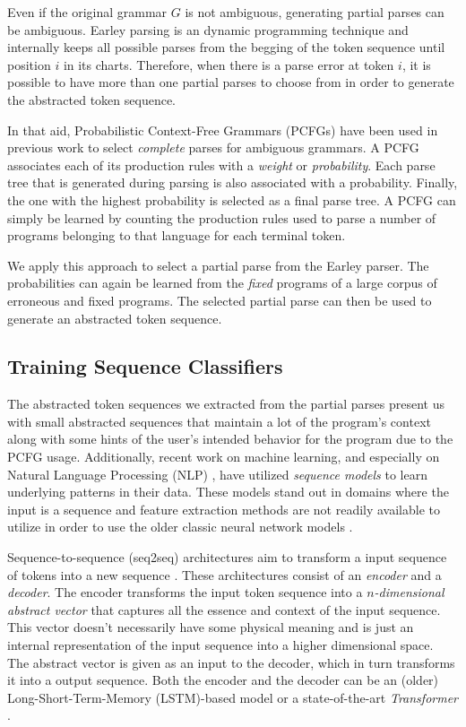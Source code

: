 

 Even if the original grammar $G$ is
not ambiguous, generating partial parses can be ambiguous. Earley parsing is an
dynamic programming technique and internally keeps all possible parses from the
begging of the token sequence until position $i$ in its charts. Therefore, when
there is a parse error at token $i$, it is possible to have more than one
partial parses to choose from in order to generate the abstracted token
sequence.

In that aid, Probabilistic Context-Free Grammars (PCFGs) have been used in
previous work \citep{?} to select \emph{complete} parses for ambiguous grammars.
A PCFG associates each of its production rules with a \emph{weight} or
\emph{probability}. Each parse tree that is generated during parsing is also
associated with a probability. Finally, the one with the highest probability is
selected as a final parse tree. A PCFG can simply be learned \citep{?} by
counting the production rules used to parse a number of programs belonging to
that language for each terminal token.

We apply this approach to select a partial parse from the Earley parser. The
probabilities can again be learned from the \emph{fixed} programs of a large
corpus of erroneous and fixed programs. The selected partial parse can then be
used to generate an abstracted token sequence.


\subsection{Training Sequence Classifiers}
\label{sec:overview:train}
The abstracted token sequences we extracted from the partial parses present us
with small abstracted sequences that maintain a lot of the program's context
along with some hints of the user's intended behavior for the program due to the
PCFG usage. Additionally, recent work on machine learning, and especially on
Natural Language Processing (NLP) \citep{?}, have utilized \emph{sequence
models} to learn underlying patterns in their data. These models stand out in
domains where the input is a sequence and feature extraction methods are not
readily available to utilize in order to use the older classic neural network
models \citep{?}.

 Sequence-to-sequence (seq2seq) architectures aim to
transform a input sequence of tokens into a new sequence \citep{?}. These
architectures consist of an \emph{encoder} and a \emph{decoder}. The encoder
transforms the input token sequence into a \emph{$n$-dimensional abstract
vector} that captures all the essence and context of the input sequence. This
vector doesn't necessarily have some physical meaning and is just an internal
representation of the input sequence into a higher dimensional space. The
abstract vector is given as an input to the decoder, which in turn transforms it
into a output sequence. Both the encoder and the decoder can be an (older)
Long-Short-Term-Memory (LSTM)-based model \citep{?} or a state-of-the-art
\emph{Transformer} \citep{?}.

